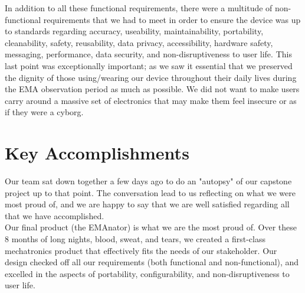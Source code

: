 \documentclass{article}
\begin{document}
In addition to all these functional requirements, there were a multitude of non-functional requirements that we had to meet in order to ensure the device was up to standards regarding accuracy, useability, maintainability, portability, cleanability, safety, reusability, data privacy, accessibility, hardware safety, messaging, performance, data security, and non-disruptiveness to user life. This last point was exceptionally important; as we saw it essential that we preserved the dignity of those using/wearing our device throughout their daily lives during the EMA observation period as much as possible. We did not want to make users carry around a massive set of electronics that may make them feel insecure or as if they were a cyborg.\\

\section{Key Accomplishments}

Our team sat down together a few days ago to do an "autopsy" of our capstone project up to that point. The conversation lead to us reflecting on what we were most proud of, and we are happy to say that we are well satisfied regarding all that we have accomplished.\\

Our final product (the EMAnator) is what we are the most proud of. Over these 8 months of long nights, blood, sweat, and tears, we created a first-class mechatronics product that effectively fits the needs of our stakeholder. Our design checked off all our requirements (both functional and non-functional), and excelled in the aspects of portability, configurability, and non-disruptiveness to user life.\\
\end{document}
